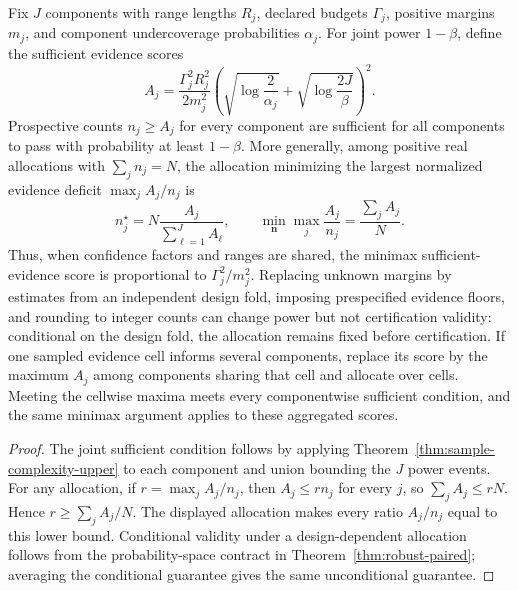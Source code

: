 \begin{corollary}
\label{cor:evidence-allocation}
Fix $J$ components with range lengths $R_j$, declared budgets $\Gamma_j$,
positive margins $m_j$, and component undercoverage probabilities $\alpha_j$.
For joint power $1-\beta$, define the sufficient evidence scores
\begin{equation}
 A_j=\frac{\Gamma_j^2R_j^2}{2m_j^2}
 \left(\sqrt{\log\frac{2}{\alpha_j}}+
       \sqrt{\log\frac{2J}{\beta}}\right)^2.
 \label{eq:evidence-score}
\end{equation}
Prospective counts $n_j\geq A_j$ for every component are sufficient for all
components to pass with probability at least $1-\beta$. More generally, among
positive real allocations with $\sum_j n_j=N$, the allocation minimizing the
largest normalized evidence deficit $\max_j A_j/n_j$ is
\begin{equation}
 n_j^\star=N\frac{A_j}{\sum_{\ell=1}^J A_\ell},
 \qquad
 \min_{\boldsymbol n}\max_j\frac{A_j}{n_j}
 =\frac{\sum_j A_j}{N}.
 \label{eq:minimax-allocation}
\end{equation}
Thus, when confidence factors and ranges are shared, the minimax
sufficient-evidence score is proportional to $\Gamma_j^2/m_j^2$. Replacing
unknown margins by estimates from
an independent design fold, imposing prespecified evidence floors, and rounding
to integer counts can change power but not certification validity: conditional
on the design fold, the allocation remains fixed before certification.
If one sampled evidence cell informs several components, replace its score by
the maximum $A_j$ among components sharing that cell and allocate over cells.
Meeting the cellwise maxima meets every componentwise sufficient condition, and
the same minimax argument applies to these aggregated scores.
\end{corollary}

\begin{proof}
The joint sufficient condition follows by applying
Theorem~\ref{thm:sample-complexity-upper} to each component and union bounding
the $J$ power events. For any allocation, if
$r=\max_j A_j/n_j$, then $A_j\leq r n_j$ for every $j$, so
$\sum_j A_j\leq rN$. Hence $r\geq\sum_j A_j/N$. The displayed allocation makes
every ratio $A_j/n_j$ equal to this lower bound. Conditional validity under a
design-dependent allocation follows from the probability-space contract in
Theorem~\ref{thm:robust-paired}; averaging the conditional guarantee gives the
same unconditional guarantee.
\end{proof}


